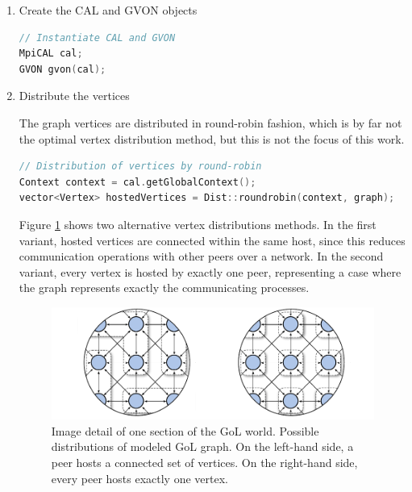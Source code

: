 \begin{enumerate}
\begin{enumerate}
\item Create the CAL and GVON objects

  \begin{minipage}[t]{\textwidth} 
  \begin{lstlisting}[language=C++, label=lst:, caption={}]
// Instantiate CAL and GVON
MpiCAL cal;
GVON gvon(cal);
  \end{lstlisting}
  \end{minipage}

\item Distribute the vertices

  The graph vertices are distributed in round-robin fashion, which
  is by far not the optimal vertex distribution method, but this is not the
  focus of this work.

  \begin{minipage}[t]{\textwidth} 
  \begin{lstlisting}[language=C++, label=lst:gol_distribution, caption={}]
// Distribution of vertices by round-robin
Context context = cal.getGlobalContext();
vector<Vertex> hostedVertices = Dist::roundrobin(context, graph);
  \end{lstlisting}
  \end{minipage}

  \noindent Figure
  \ref{fig:gol_mapping} shows two alternative vertex distributions
  methods.  In the first variant, hosted vertices are connected
  within the same host, since this reduces communication operations
  with other peers over a network.  In the second variant, every vertex is
  hosted by exactly one peer, representing a case where the graph
  represents exactly the communicating processes.

  \begin{figure}[H]
    \centering
    \includegraphics[width=\textwidth]{graphics/40_gol_mapping}
    \caption{Image detail of one section of the GoL world. Possible
      distributions of modeled GoL graph. On the left-hand side, a
      peer hosts a connected set of vertices. On the right-hand side,
      every peer hosts exactly one vertex.}
    \label{fig:gol_mapping}
  \end{figure}


\end{enumerate}
\end{enumerate}
